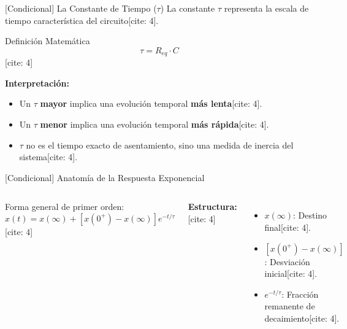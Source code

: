 \documentclass[aspectratio=169, 10pt]{beamer}
\begin{document}
\begin{frame}{[Condicional] La Constante de Tiempo ($\tau$)}
    La constante $\tau$ representa la escala de tiempo característica del circuito[cite: 4].
    
    \begin{block}{Definición Matemática}
        $$\tau = R_{eq} \cdot C$$
[cite: 4]
    \end{block}
    
    \textbf{Interpretación:}
    \begin{itemize}
        \item Un $\tau$ \textbf{mayor} implica una evolución temporal \textbf{más lenta}[cite: 4].
        \item Un $\tau$ \textbf{menor} implica una evolución temporal \textbf{más rápida}[cite: 4].
        \item $\tau$ no es el tiempo exacto de asentamiento, sino una medida de inercia del sistema[cite: 4].
    \end{itemize}
\end{frame}

\begin{frame}{[Condicional] Anatomía de la Respuesta Exponencial}
    \begin{columns}
        Forma general de primer orden:
        $$x(t) = x(\infty) + \left[ x(0^+) - x(\infty) \right] e^{-t/\tau}$$
[cite: 4]
        
        \vspace{0.2cm}
        \textbf{Estructura:}[cite: 4]
        \begin{itemize}
            \item $x(\infty)$: Destino final[cite: 4].
            \item $\left[ x(0^+) - x(\infty) \right]$: Desviación inicial[cite: 4].
            \item $e^{-t/\tau}$: Fracción remanente de decaimiento[cite: 4].
        \end{itemize}
        
    \end{columns}
\end{frame}
\end{document}
